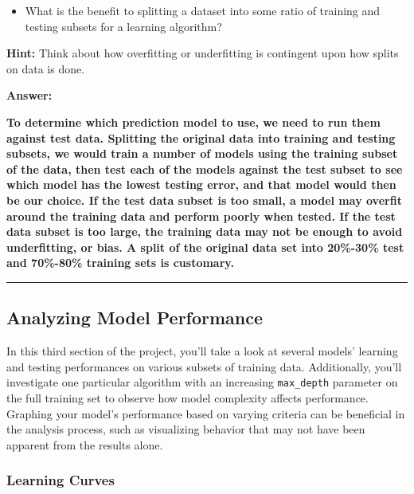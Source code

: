 \documentclass[11pt]{article}
\providecommand{\tightlist}{%
      \setlength{\itemsep}{0pt}\setlength{\parskip}{0pt}}
\begin{document}
\begin{itemize}
\tightlist
\item
  What is the benefit to splitting a dataset into some ratio of training
  and testing subsets for a learning algorithm?
\end{itemize}

\textbf{Hint:} Think about how overfitting or underfitting is contingent
upon how splits on data is done.

    \textbf{Answer:}

\textbf{To determine which prediction model to use, we need to run them
against test data. Splitting the original data into training and testing
subsets, we would train a number of models using the training subset of
the data, then test each of the models against the test subset to see
which model has the lowest testing error, and that model would then be
our choice. If the test data subset is too small, a model may overfit
around the training data and perform poorly when tested. If the test
data subset is too large, the training data may not be enough to avoid
underfitting, or bias. A split of the original data set into 20\%-30\%
test and 70\%-80\% training sets is customary.}

    \begin{center}\rule{0.5\linewidth}{\linethickness}\end{center}

\hypertarget{analyzing-model-performance}{%
\subsection{Analyzing Model
Performance}\label{analyzing-model-performance}}

In this third section of the project, you'll take a look at several
models' learning and testing performances on various subsets of training
data. Additionally, you'll investigate one particular algorithm with an
increasing \texttt{\textquotesingle{}max\_depth\textquotesingle{}}
parameter on the full training set to observe how model complexity
affects performance. Graphing your model's performance based on varying
criteria can be beneficial in the analysis process, such as visualizing
behavior that may not have been apparent from the results alone.

    \hypertarget{learning-curves}{%
\subsubsection{Learning Curves}\label{learning-curves}}
\end{document}
